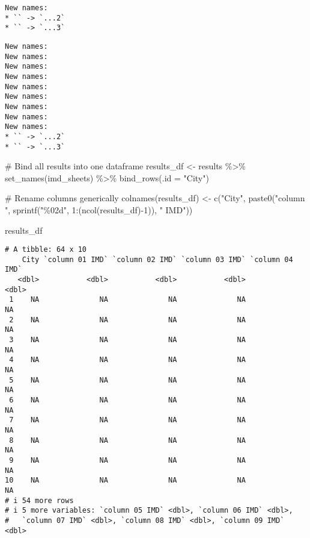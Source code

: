 \documentclass[
  english,
  12pt,
  a4paper,
]{scrartcl}
\newenvironment{Shaded}{\begin{snugshade}}{\end{snugshade}}
\newcommand{\AttributeTok}[1]{\textcolor[rgb]{0.40,0.45,0.13}{#1}}
\newcommand{\CommentTok}[1]{\textcolor[rgb]{0.37,0.37,0.37}{#1}}
\newcommand{\DecValTok}[1]{\textcolor[rgb]{0.68,0.00,0.00}{#1}}
\newcommand{\FunctionTok}[1]{\textcolor[rgb]{0.28,0.35,0.67}{#1}}
\newcommand{\NormalTok}[1]{\textcolor[rgb]{0.00,0.23,0.31}{#1}}
\newcommand{\OtherTok}[1]{\textcolor[rgb]{0.00,0.23,0.31}{#1}}
\newcommand{\SpecialCharTok}[1]{\textcolor[rgb]{0.37,0.37,0.37}{#1}}
\newcommand{\StringTok}[1]{\textcolor[rgb]{0.13,0.47,0.30}{#1}}
\begin{document}
\begin{verbatim}
New names:
* `` -> `...2`
* `` -> `...3`
\end{verbatim}

\begin{verbatim}
New names:
New names:
New names:
New names:
New names:
New names:
New names:
New names:
New names:
* `` -> `...2`
* `` -> `...3`
\end{verbatim}

\begin{Shaded}
\begin{Highlighting}[]
\CommentTok{\# Bind all results into one dataframe}
\NormalTok{results\_df }\OtherTok{\textless{}{-}}\NormalTok{ results }\SpecialCharTok{\%\textgreater{}\%}
  \FunctionTok{set\_names}\NormalTok{(imd\_sheets) }\SpecialCharTok{\%\textgreater{}\%}
  \FunctionTok{bind\_rows}\NormalTok{(}\AttributeTok{.id =} \StringTok{"City"}\NormalTok{)}

\CommentTok{\# Rename columns generically}
\FunctionTok{colnames}\NormalTok{(results\_df) }\OtherTok{\textless{}{-}} \FunctionTok{c}\NormalTok{(}\StringTok{"City"}\NormalTok{, }\FunctionTok{paste0}\NormalTok{(}\StringTok{"column "}\NormalTok{, }\FunctionTok{sprintf}\NormalTok{(}\StringTok{"\%02d"}\NormalTok{, }\DecValTok{1}\SpecialCharTok{:}\NormalTok{(}\FunctionTok{ncol}\NormalTok{(results\_df)}\SpecialCharTok{{-}}\DecValTok{1}\NormalTok{)), }\StringTok{" IMD"}\NormalTok{))}

\NormalTok{results\_df}
\end{Highlighting}
\end{Shaded}

\begin{verbatim}
# A tibble: 64 x 10
    City `column 01 IMD` `column 02 IMD` `column 03 IMD` `column 04 IMD`
   <dbl>           <dbl>           <dbl>           <dbl>           <dbl>
 1    NA              NA              NA              NA              NA
 2    NA              NA              NA              NA              NA
 3    NA              NA              NA              NA              NA
 4    NA              NA              NA              NA              NA
 5    NA              NA              NA              NA              NA
 6    NA              NA              NA              NA              NA
 7    NA              NA              NA              NA              NA
 8    NA              NA              NA              NA              NA
 9    NA              NA              NA              NA              NA
10    NA              NA              NA              NA              NA
# i 54 more rows
# i 5 more variables: `column 05 IMD` <dbl>, `column 06 IMD` <dbl>,
#   `column 07 IMD` <dbl>, `column 08 IMD` <dbl>, `column 09 IMD` <dbl>
\end{verbatim}
\end{document}
